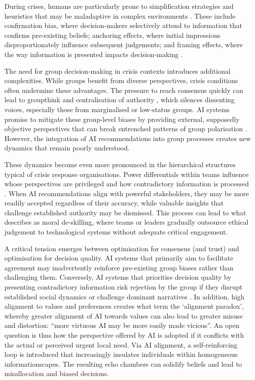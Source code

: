 \documentclass[sn-apacite]{sn-jnl}
\begin{document}
During crises, humans are particularly prone to simplification strategies and heuristics that may be maladaptive in complex environments \citep{klein2010rapid}. These include confirmation bias, where decision-makers selectively attend to information that confirms pre-existing beliefs; anchoring effects, where initial impressions disproportionately influence subsequent judgements; and framing effects, where the way information is presented impacts decision-making \citep{paulus2022influence}.

The need for group decision-making in crisis contexts introduces additional complexities. While groups benefit from diverse perspectives, crisis conditions often undermine these advantages. The pressure to reach consensus quickly can lead to groupthink and centralisation of authority \citep{driskell1991group}, which silences dissenting voices, especially those from marginalised or low-status groups. AI systems promise to mitigate these group-level biases by providing external, supposedly objective perspectives that can break entrenched patterns of group polarisation \citep{jirovsky2021can}. However, the integration of AI recommendations into group processes creates new dynamics that remain poorly understood.

These dynamics become even more pronounced in the hierarchical structures typical of crisis response organisations. Power differentials within teams influence whose perspectives are privileged and how contradictory information is processed \citep{comes2024ai}. When AI recommendations align with powerful stakeholders, they may be more readily accepted regardless of their accuracy, while valuable insights that challenge established authority may be dismissed. This process can lead to what \citet{vallor2015moral} describes as moral de-skilling, where teams or leaders gradually outsource ethical judgement to technological systems without adequate critical engagement.

A critical tension emerges between optimisation for consensus (and trust) and optimisation for decision quality. AI systems that primarily aim to facilitate agreement may inadvertently reinforce pre-existing group biases rather than challenging them. Conversely, AI systems that prioritise decision quality by presenting contradictory information risk rejection by the group if they disrupt established social dynamics or challenge dominant narratives \citep{manzini2024should}. In addition, high alignment to values and preferences creates what \citet{west2025alignment} term the `alignment paradox', whereby greater alignment of AI towards values can also lead to greater misuse and distortion: ``more virtuous AI may be more easily made vicious''. An open question is thus how the perspective offered by AI is adopted if it conflicts with the actual or perceived urgent local need. Via AI alignment, a self-reinforcing loop is introduced that increasingly insulates individuals within homogeneous informationscapes. The resulting echo chambers can solidify beliefs and lead to misallocation and biased decisions.
\end{document}
